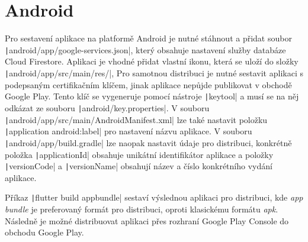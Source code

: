 \section{Android}

Pro sestavení aplikace na platformě Android je nutné stáhnout a přidat soubor
\texttt|android/app/google-services.json|,
který obsahuje nastavení služby databáze Cloud Firestore.
Aplikaci je vhodné přidat vlastní ikonu,
která se uloží do složky \texttt|android/app/src/main/res/|,
Pro samotnou distribuci je nutné sestavit aplikaci
s podepsaným certifikačním klíčem,
jinak aplikace nepůjde publikovat v obchodě Google Play. 
Tento klíč se vygeneruje pomocí nástroje \texttt|keytool|
a musí se na něj odkázat ze souboru \texttt|android/key.properties|.
V souboru
\texttt|android/app/src/main/AndroidManifest.xml|
lze také nastavit položku
\texttt|application android:label|
pro nastavení názvu aplikace.
V souboru
\texttt|android/app/build.gradle|
lze naopak nastavit údaje pro distribuci,
konkrétně položka \texttt|applicationId|
obsahuje unikátní identifikátor aplikace
a položky \texttt|versionCode| a \texttt|versionName|
obsahují název
a číslo konkrétního vydání aplikace.~\cite{flutter_deploy_android}

Příkaz \texttt|flutter build appbundle| sestaví výslednou aplikaci
pro distribuci,
kde \emph{app bundle} je preferovaný formát pro distribuci,
oproti klasickému formátu \emph{apk}.
Následně je možné distribuovat aplikaci přes rozhraní Google Play Console
do obchodu Google Play.
